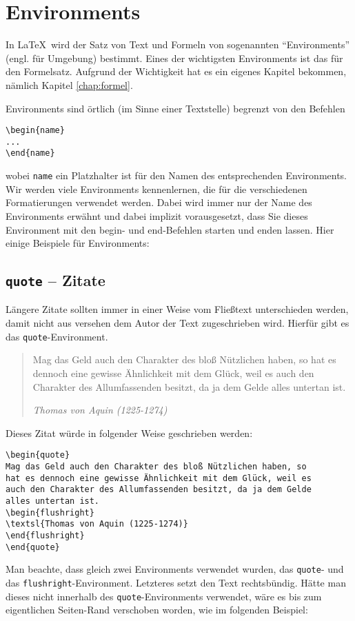 \section{Environments}

In \LaTeX\ wird der Satz von Text und Formeln von sogenannten "`Environments"' (engl. für Umgebung) bestimmt. Eines der wichtigsten Environments ist das für den Formelsatz. Aufgrund der Wichtigkeit hat es ein eigenes Kapitel bekommen, nämlich Kapitel \ref{chap:formel}.

Environments sind örtlich (im Sinne einer Textstelle) begrenzt von den Befehlen 
\begin{verbatim}
\begin{name}
...
\end{name}
\end{verbatim}
wobei \texttt{name} ein Platzhalter ist für den Namen des entsprechenden Environments. Wir werden viele Environments kennenlernen, die für die verschiedenen Formatierungen verwendet werden. Dabei wird immer nur der Name des Environments erwähnt und dabei implizit vorausgesetzt, dass Sie dieses Environment mit den begin- und end-Befehlen starten und enden lassen. Hier einige Beispiele für Environments:

\subsection{\texttt{quote} -- Zitate} 

Längere Zitate sollten immer in einer Weise vom Fließtext unterschieden werden, damit nicht aus versehen dem Autor der Text zugeschrieben wird. Hierfür gibt es das \texttt{quote}-Environment.

\begin{quote}
Mag das Geld auch den Charakter des bloß Nützlichen haben, so hat es dennoch eine gewisse Ähnlichkeit mit dem Glück, weil es auch den Charakter des Allumfassenden besitzt, da ja dem Gelde alles untertan ist.
\begin{flushright}
\textsl{Thomas von Aquin (1225-1274)}
\end{flushright}
\end{quote}
Dieses Zitat würde in folgender Weise geschrieben werden:
\begin{verbatim}
\begin{quote}
Mag das Geld auch den Charakter des bloß Nützlichen haben, so 
hat es dennoch eine gewisse Ähnlichkeit mit dem Glück, weil es 
auch den Charakter des Allumfassenden besitzt, da ja dem Gelde 
alles untertan ist.
\begin{flushright}
\textsl{Thomas von Aquin (1225-1274)}
\end{flushright}
\end{quote}
\end{verbatim}
Man beachte, dass gleich zwei Environments verwendet wurden, das \texttt{quote}- und das \texttt{flushright}-Environment. Letzteres setzt den Text rechtsbündig. Hätte man dieses nicht innerhalb des \texttt{quote}-Environments verwendet, wäre es bis zum eigentlichen Seiten-Rand verschoben worden, wie im folgenden Beispiel:

